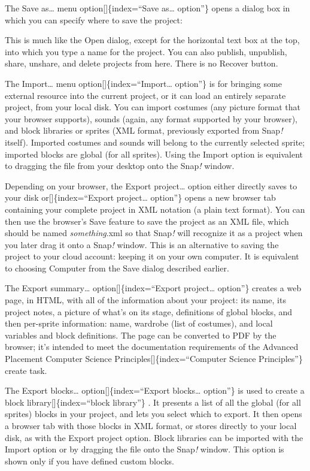 \documentclass[
  letterpaper,
]{book}
\begin{document}
The Save as\ldots{} menu option{[}{]}\{index=``Save as\ldots{}
option''\} opens a dialog box in which you can specify where to save the
project:

This is much like the Open dialog, except for the horizontal text box at
the top, into which you type a name for the project. You can also
publish, unpublish, share, unshare, and delete projects from here. There
is no Recover button.

The Import\ldots{} menu option{[}{]}\{index=``Import\ldots{} option''\}
is for bringing some external resource into the current project, or it
can load an entirely separate project, from your local disk. You can
import costumes (any picture format that your browser supports), sounds
(again, any format supported by your browser), and block libraries or
sprites (XML format, previously exported from Snap\emph{!} itself).
Imported costumes and sounds will belong to the currently selected
sprite; imported blocks are global (for all sprites). Using the Import
option is equivalent to dragging the file from your desktop onto the
Snap\emph{!} window.

Depending on your browser, the Export project\ldots{} option either
directly saves to your disk or{[}{]}\{index=``Export project\ldots{}
option''\} opens a new browser tab containing your complete project in
XML notation (a plain text format). You can then use the browser's Save
feature to save the project as an XML file, which should be named
\emph{something}.xml so that Snap\emph{!} will recognize it as a project
when you later drag it onto a Snap\emph{!} window. This is an
alternative to saving the project to your cloud account: keeping it on
your own computer. It is equivalent to choosing Computer from the Save
dialog described earlier.

The Export summary\ldots{} option{[}{]}\{index=``Export project\ldots{}
option''\} creates a web page, in HTML, with all of the information
about your project: its name, its project notes, a picture of what's on
its stage, definitions of global blocks, and then per-sprite
information: name, wardrobe (list of costumes), and local variables and
block definitions. The page can be converted to PDF by the browser; it's
intended to meet the documentation requirements of the Advanced
Placement Computer Science Principles{[}{]}\{index=``Computer Science
Principles''\} create task.

The Export blocks\ldots{} option{[}{]}\{index=``Export blocks\ldots{}
option''\} is used to create a block library{[}{]}\{index=``block
library''\} . It presents a list of all the global (for all sprites)
blocks in your project, and lets you select which to export. It then
opens a browser tab with those blocks in XML format, or stores directly
to your local disk, as with the Export project option. Block libraries
can be imported with the Import option or by dragging the file onto the
Snap\emph{!} window. This option is shown only if you have defined
custom blocks.
\end{document}
